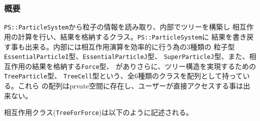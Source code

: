 \subsubsection{概要}

{\tt PS::ParticleSystem}から粒子の情報を読み取り、内部でツリーを構築し
相互作用の計算を行い、結果を格納するクラス。{\tt PS::ParticleSystem}に
結果を書き戻す事も出来る。内部には相互作用演算を効率的に行う為の3種類の
粒子型\verb|EssentialParticleI|型、\verb|EssentialParticleJ|型、
\verb|SuperParticleJ|型、また、相互作用の結果を格納する\verb|Force|型、
がありさらに、ツリー構造を実現するための\verb|TreeParticle|型、
\verb|TreeCell|型という、全6種類のクラスを配列として持っている。これら
の配列はprvate空間に存在し、ユーザーが直接アクセスする事は出来ない。

相互作用クラス({\tt TreeForForce})は以下のように記述される。

